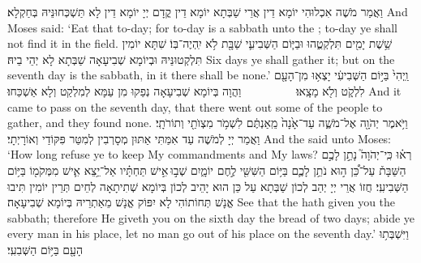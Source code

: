 {וַאֲמַר מֹשֶׁה אִכְלוּהִי יוֹמָא דֵין אֲרֵי שַׁבְּתָא יוֹמָא דֵין קֳדָם יְיָ יוֹמָא דֵין לָא תַּשְׁכְּחוּנֵּיהּ בְּחַקְלָא׃}
{And Moses said: ‘Eat that to-day; for to-day is a sabbath unto the \lord; to-day ye shall not find it in the field.}{}
{שֵׁ֥שֶׁת יָמִ֖ים תִּלְקְטֻ֑הוּ וּבַיּ֧וֹם הַשְּׁבִיעִ֛י שַׁבָּ֖ת לֹ֥א יִֽהְיֶה־בּֽוֹ׃
}
{שִׁתָּא יוֹמִין תִּלְקְטוּנֵּיהּ וּבְיוֹמָא שְׁבִיעָאָה שַׁבְּתָא לָא יְהֵי בֵיהּ׃}
{Six days ye shall gather it; but on the seventh day is the sabbath, in it there shall be none.’}{}
{וַֽיְהִי֙ בַּיּ֣וֹם הַשְּׁבִיעִ֔י יָצְא֥וּ מִן־הָעָ֖ם לִלְקֹ֑ט וְלֹ֖א מָצָֽאוּ׃ \setuma         }
{וַהֲוָה בְּיוֹמָא שְׁבִיעָאָה נְפַקוּ מִן עַמָּא לְמִלְקַט וְלָא אַשְׁכַּחוּ׃}
{And it came to pass on the seventh day, that there went out some of the people to gather, and they found none.}{}
{וַיֹּ֥אמֶר יְהֹוָ֖ה אֶל־מֹשֶׁ֑ה עַד־אָ֙נָה֙ מֵֽאַנְתֶּ֔ם לִשְׁמֹ֥ר מִצְוֺתַ֖י וְתוֹרֹתָֽי׃
}
{וַאֲמַר יְיָ לְמֹשֶׁה עַד אִמַּתִּי אַתּוּן מְסָרְבִין לְמִטַּר פִּקּוֹדַי וְאוֹרָיְתָי׃}
{And the \lord\space said unto Moses: ‘How long refuse ye to keep My commandments and My laws?}{}
{רְא֗וּ כִּֽי־יְהֹוָה֮ נָתַ֣ן לָכֶ֣ם הַשַּׁבָּת֒ עַל־כֵּ֠ן ה֣וּא נֹתֵ֥ן לָכֶ֛ם בַּיּ֥וֹם הַשִּׁשִּׁ֖י לֶ֣חֶם יוֹמָ֑יִם שְׁב֣וּ \legarmeh  אִ֣ישׁ תַּחְתָּ֗יו אַל־יֵ֥צֵא אִ֛ישׁ מִמְּקֹמ֖וֹ בַּיּ֥וֹם הַשְּׁבִיעִֽי׃
}
{חֲזוֹ אֲרֵי יְיָ יְהַב לְכוֹן שַׁבְּתָא עַל כֵּן הוּא יָהֵיב לְכוֹן בְּיוֹמָא שְׁתִיתָאָה לְחֵים תְּרֵין יוֹמִין תִּיבוּ אֱנָשׁ תְּחוֹתוֹהִי לָא יִפּוֹק אֱנָשׁ מֵאַתְרֵיהּ בְּיוֹמָא שְׁבִיעָאָה׃}
{See that the \lord\space hath given you the sabbath; therefore He giveth you on the sixth day the bread of two days; abide ye every man in his place, let no man go out of his place on the seventh day.’}{}
{וַיִּשְׁבְּת֥וּ הָעָ֖ם בַּיּ֥וֹם הַשְּׁבִעִֽי׃}
